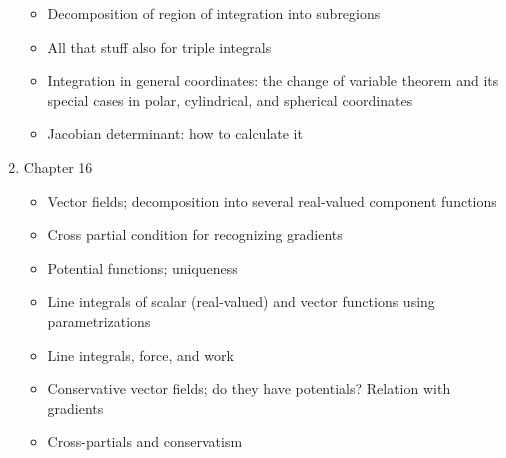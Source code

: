\documentclass[12pt]{amsart}
\begin{document}
\begin{enumerate}
\begin{itemize}
    \item Decomposition of region of integration into subregions
    \item All that stuff also for triple integrals
    \item Integration in general coordinates: the change of variable theorem and its special cases in polar, cylindrical, and spherical coordinates
    \item Jacobian determinant: how to calculate it
\end{itemize}
\item Chapter 16
\begin{itemize}
    \item Vector fields; decomposition into several real-valued component functions
    \item Cross partial condition for recognizing gradients
    \item Potential functions; uniqueness
    \item Line integrals of scalar (real-valued) and vector functions using parametrizations
    \item Line integrals, force, and work
    \item Conservative vector fields; do they have potentials? Relation with gradients
    \item Cross-partials and conservatism
\end{itemize}
\end{enumerate} 
\end{document}
